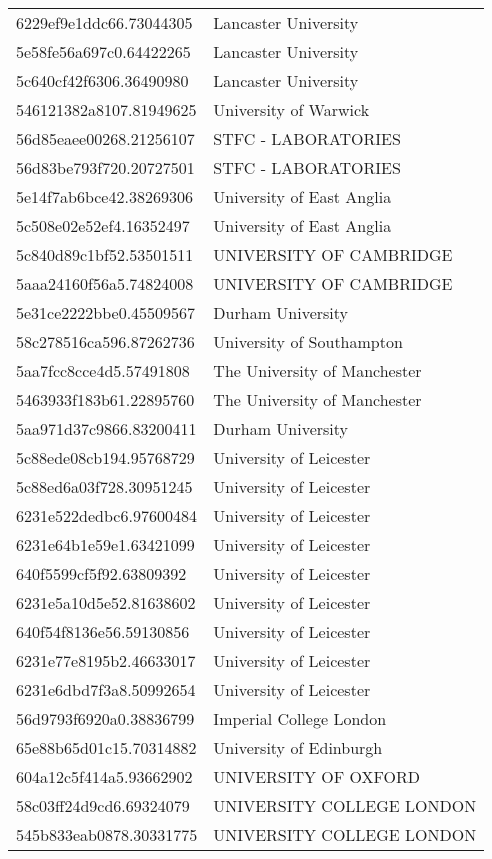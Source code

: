 \begin{tabular}{ll}
6229ef9e1ddc66.73044305 & Lancaster University \\
5e58fe56a697c0.64422265 & Lancaster University \\
5c640cf42f6306.36490980 & Lancaster University \\
546121382a8107.81949625 & University of Warwick \\
56d85eaee00268.21256107 & STFC - LABORATORIES \\
56d83be793f720.20727501 & STFC - LABORATORIES \\
5e14f7ab6bce42.38269306 & University of East Anglia \\
5c508e02e52ef4.16352497 & University of East Anglia \\
5c840d89c1bf52.53501511 & UNIVERSITY OF CAMBRIDGE \\
5aaa24160f56a5.74824008 & UNIVERSITY OF CAMBRIDGE \\
5e31ce2222bbe0.45509567 & Durham University \\
58c278516ca596.87262736 & University of Southampton \\
5aa7fcc8cce4d5.57491808 & The University of Manchester \\
5463933f183b61.22895760 & The University of Manchester \\
5aa971d37c9866.83200411 & Durham University \\
5c88ede08cb194.95768729 & University of Leicester \\
5c88ed6a03f728.30951245 & University of Leicester \\
6231e522dedbc6.97600484 & University of Leicester \\
6231e64b1e59e1.63421099 & University of Leicester \\
640f5599cf5f92.63809392 & University of Leicester \\
6231e5a10d5e52.81638602 & University of Leicester \\
640f54f8136e56.59130856 & University of Leicester \\
6231e77e8195b2.46633017 & University of Leicester \\
6231e6dbd7f3a8.50992654 & University of Leicester \\
56d9793f6920a0.38836799 & Imperial College London \\
65e88b65d01c15.70314882 & University of Edinburgh \\
604a12c5f414a5.93662902 & UNIVERSITY OF OXFORD \\
58c03ff24d9cd6.69324079 & UNIVERSITY COLLEGE LONDON \\
545b833eab0878.30331775 & UNIVERSITY COLLEGE LONDON \\

\end{tabular}
